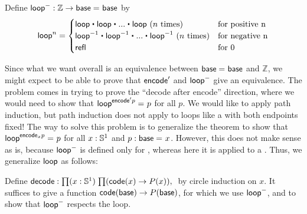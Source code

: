 \begin{defn}
Define $\mathsf{loop}^- : \mathbb{Z} \rightarrow \mathsf{base} =_{} \mathsf{base}$ by 
\[
\lloop^n = \begin{cases} \lloop \ct \lloop \ct ... \ct \lloop \text{ ($n$ times) } & \text{for positive n} \\
 \opp \lloop \ct \opp \lloop \ct ... \ct \opp \lloop \text{ ($n$ times)} & \text{for negative n} \\
  \refl{} & \text{for 0}  
\end{cases}
\]
\end{defn}

Since what we want overall is an equivalence between $\mathsf{base} =_{} \mathsf{base}$
and $\mathbb{Z}$, we might expect to be able to prove that $\mathsf{encode}'$
and $\mathsf{loop}^-$ give an equivalence.  The problem comes in trying to prove
the ``decode after encode'' direction, where we would need to show that
$\mathsf{loop}^{\mathsf{encode}' p} =_{} p$ for all $p$.  We would like to apply path
induction, but path induction does not apply to loops like a with both
endpoints fixed!  The way to solve this problem is to generalize the
theorem to show that $\mathsf{loop}^{{\mathsf{encode}_x p}} =_{} p$ for all $x: \mathbb{S} ^1$
and $p : \mathsf{base} =_{} x$.  However, this does not make sense as is, because
$\mathsf{loop}^-$ is defined only for \id{\base}{\base}, whereas here it is
applied to a .  Thus, we generalize 
$\mathsf{loop}$ as follows:

\begin{defn}
Define $\decode : \prd{x : \Sn ^1}{\code(x) \rightarrow P(x)}$ by 
circle induction on $x$.  It suffices to give a function 
${\mathsf{code}(\mathsf{base}) \rightarrow P(\mathsf{base})}$, for which we use $\mathsf{loop}^-$, and 
to show that $\mathsf{loop}^-$ respects the loop.  
\end{defn}

